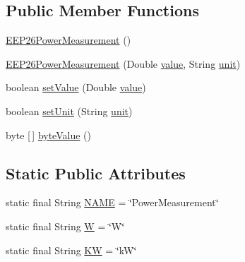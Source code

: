 \subsection*{Public Member Functions}
\begin{DoxyCompactItemize}
\item 
\hyperlink{classit_1_1polito_1_1elite_1_1enocean_1_1enj_1_1eep_1_1eep26_1_1attributes_1_1_e_e_p26_power_measurement_a3807dcd3faa65c26e9f7a0d1acb2aac8}{E\+E\+P26\+Power\+Measurement} ()
\item 
\hyperlink{classit_1_1polito_1_1elite_1_1enocean_1_1enj_1_1eep_1_1eep26_1_1attributes_1_1_e_e_p26_power_measurement_ae925a478743e589ffd9c45c7a516b5e5}{E\+E\+P26\+Power\+Measurement} (Double \hyperlink{classit_1_1polito_1_1elite_1_1enocean_1_1enj_1_1eep_1_1_e_e_p_attribute_af4d7e34642004bb6ccfae51e925c983d}{value}, String \hyperlink{classit_1_1polito_1_1elite_1_1enocean_1_1enj_1_1eep_1_1_e_e_p_attribute_a3fe5b3d613c30066354ad66eeb23b8ae}{unit})
\item 
boolean \hyperlink{classit_1_1polito_1_1elite_1_1enocean_1_1enj_1_1eep_1_1eep26_1_1attributes_1_1_e_e_p26_power_measurement_a0fe6b204893cc6dc842d5031749240f8}{set\+Value} (Double \hyperlink{classit_1_1polito_1_1elite_1_1enocean_1_1enj_1_1eep_1_1_e_e_p_attribute_af4d7e34642004bb6ccfae51e925c983d}{value})
\item 
boolean \hyperlink{classit_1_1polito_1_1elite_1_1enocean_1_1enj_1_1eep_1_1eep26_1_1attributes_1_1_e_e_p26_power_measurement_a6256d7db8710f958f5d5ee28ef6002ba}{set\+Unit} (String \hyperlink{classit_1_1polito_1_1elite_1_1enocean_1_1enj_1_1eep_1_1_e_e_p_attribute_a3fe5b3d613c30066354ad66eeb23b8ae}{unit})
\item 
byte \mbox{[}$\,$\mbox{]} \hyperlink{classit_1_1polito_1_1elite_1_1enocean_1_1enj_1_1eep_1_1eep26_1_1attributes_1_1_e_e_p26_power_measurement_aba766a14fb35823c46279520ef4eec62}{byte\+Value} ()
\end{DoxyCompactItemize}
\subsection*{Static Public Attributes}
\begin{DoxyCompactItemize}
\item 
static final String \hyperlink{classit_1_1polito_1_1elite_1_1enocean_1_1enj_1_1eep_1_1eep26_1_1attributes_1_1_e_e_p26_power_measurement_afbb569921c1be6eeda841101c96062d9}{N\+A\+ME} = \char`\"{}Power\+Measurement\char`\"{}
\item 
static final String \hyperlink{classit_1_1polito_1_1elite_1_1enocean_1_1enj_1_1eep_1_1eep26_1_1attributes_1_1_e_e_p26_power_measurement_a5ad288bd287961f779157699def5fe95}{W} = \char`\"{}W\char`\"{}
\item 
static final String \hyperlink{classit_1_1polito_1_1elite_1_1enocean_1_1enj_1_1eep_1_1eep26_1_1attributes_1_1_e_e_p26_power_measurement_a91d29062b4f7e73e7583324707e8369b}{KW} = \char`\"{}kW\char`\"{}
\end{DoxyCompactItemize}
